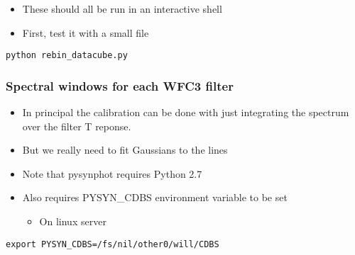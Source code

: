 \documentclass[11pt]{article}
\begin{document}
\begin{enumerate}
\begin{enumerate}
\begin{itemize}
\item These should all be run in an interactive shell
\item First, test it with a small file
\end{itemize}
\begin{verbatim}
python rebin_datacube.py
\end{verbatim}
\end{enumerate}
\end{enumerate}

\subsubsection{Spectral windows for each WFC3 filter}
\label{sec:orgheadline32}
\begin{itemize}
\item In principal the calibration can be done with just integrating the spectrum over the filter T reponse.
\item But we really need to fit Gaussians to the lines
\item Note that pysynphot requires Python 2.7
\item Also requires PYSYN\_CDBS environment variable to be set
\begin{itemize}
\item On linux server
\end{itemize}
\end{itemize}
\begin{verbatim}
export PYSYN_CDBS=/fs/nil/other0/will/CDBS
\end{verbatim}
\end{document}
